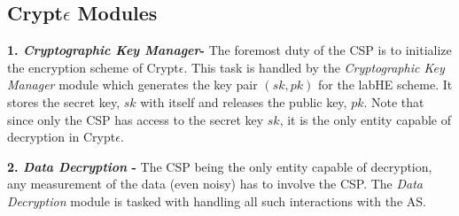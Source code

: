 \subsection{Crypt$\epsilon$ Modules}


\textbf{1. \textit{ Cryptographic Key Manager}-} The foremost duty of the \textsf{CSP} is to initialize the encryption scheme of Crypt$\epsilon$. This task is handled by the \textit{Cryptographic Key Manager} module which generates the key pair $(sk,pk)$ for the \textsf{labHE} scheme. It stores the secret key, $sk$ with itself and releases the public key, $pk$. Note that since only the \textsf{CSP} has access to the secret key $sk$, it is the only entity capable of decryption in Crypt$\epsilon$.

\textbf{2. \textit{ Data Decryption} - } The \textsf{CSP} being the only entity capable of decryption,  any measurement of the data (even noisy) has to involve the \textsf{CSP}. The \textit{Data Decryption} module is tasked with handling all such interactions with the \textsf{AS}. 

